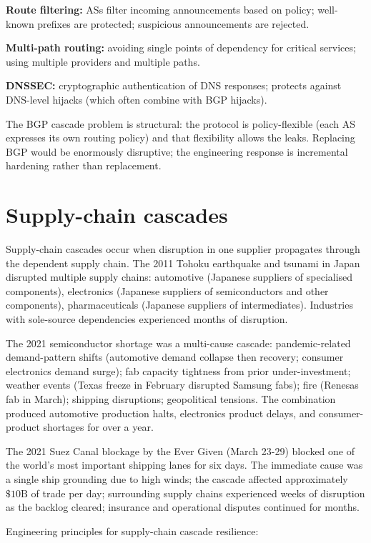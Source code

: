 \textbf{Route filtering:} ASs filter incoming announcements based on policy; well-known prefixes are protected; suspicious announcements are rejected.

\textbf{Multi-path routing:} avoiding single points of dependency for critical services; using multiple providers and multiple paths.

\textbf{DNSSEC:} cryptographic authentication of DNS responses; protects against DNS-level hijacks (which often combine with BGP hijacks).

The BGP cascade problem is structural: the protocol is policy-flexible (each AS expresses its own routing policy) and that flexibility allows the leaks. Replacing BGP would be enormously disruptive; the engineering response is incremental hardening rather than replacement.

\section{Supply-chain cascades}

Supply-chain cascades occur when disruption in one supplier propagates through the dependent supply chain. The 2011 Tohoku earthquake and tsunami in Japan disrupted multiple supply chains: automotive (Japanese suppliers of specialised components), electronics (Japanese suppliers of semiconductors and other components), pharmaceuticals (Japanese suppliers of intermediates). Industries with sole-source dependencies experienced months of disruption.

The 2021 semiconductor shortage was a multi-cause cascade: pandemic-related demand-pattern shifts (automotive demand collapse then recovery; consumer electronics demand surge); fab capacity tightness from prior under-investment; weather events (Texas freeze in February disrupted Samsung fabs); fire (Renesas fab in March); shipping disruptions; geopolitical tensions. The combination produced automotive production halts, electronics product delays, and consumer-product shortages for over a year.

The 2021 Suez Canal blockage by the Ever Given (March 23-29) blocked one of the world's most important shipping lanes for six days. The immediate cause was a single ship grounding due to high winds; the cascade affected approximately $\$10\text{B}$ of trade per day; surrounding supply chains experienced weeks of disruption as the backlog cleared; insurance and operational disputes continued for months.

Engineering principles for supply-chain cascade resilience:

